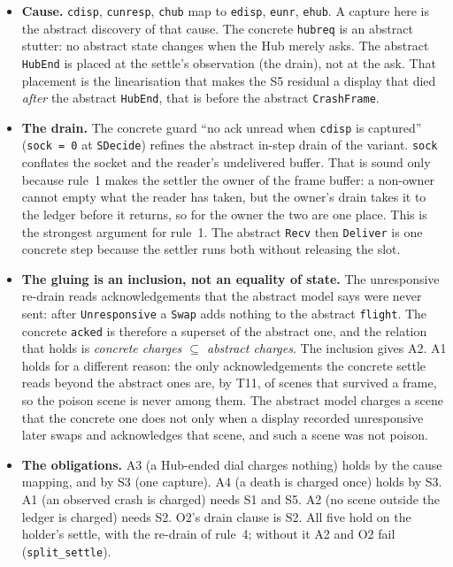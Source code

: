 \documentclass[a4paper,10pt,fleqn]{article}
\begin{document}
\begin{itemize}
  \item \textbf{Cause.}  \texttt{cdisp}, \texttt{cunresp}, \texttt{chub} map to
    \texttt{edisp}, \texttt{eunr}, \texttt{ehub}.  A capture here is the abstract
    discovery of that cause.  The concrete \texttt{hubreq} is an abstract
    stutter: no abstract state changes when the Hub merely asks.  The abstract
    \texttt{HubEnd} is placed at the settle's observation (the drain), not at the
    ask.  That placement is the linearisation that makes the S5 residual a
    display that died \emph{after} the abstract \texttt{HubEnd}, that is before
    the abstract \texttt{CrashFrame}.
  \item \textbf{The drain.}  The concrete guard ``no ack unread when
    \texttt{cdisp} is captured'' (\texttt{sock = 0} at \texttt{SDecide}) refines
    the abstract in-step drain of the variant.  \texttt{sock} conflates the socket
    and the reader's undelivered buffer.  That is sound only because rule~1 makes
    the settler the owner of the frame buffer: a non-owner cannot empty what the
    reader has taken, but the owner's drain takes it to the ledger before it
    returns, so for the owner the two are one place.  This is the strongest
    argument for rule~1.  The abstract \texttt{Recv} then \texttt{Deliver} is one
    concrete step because the settler runs both without releasing the slot.
  \item \textbf{The gluing is an inclusion, not an equality of state.}  The
    unresponsive re-drain reads acknowledgements that the abstract model says
    were never sent: after \texttt{Unresponsive} a \texttt{Swap} adds nothing to
    the abstract \texttt{flight}.  The concrete \texttt{acked} is therefore a
    superset of the abstract one, and the relation that holds is
    \emph{concrete charges $\subseteq$ abstract charges}.  The inclusion gives A2.
    A1 holds for a different reason: the only acknowledgements the concrete
    settle reads beyond the abstract ones are, by T11, of scenes that survived a
    frame, so the poison scene is never among them.  The abstract model charges
    a scene that the concrete one does not only when a display recorded
    unresponsive later swaps and acknowledges that scene, and such a scene was
    not poison.
  \item \textbf{The obligations.}  A3 (a Hub-ended dial charges nothing) holds by
    the cause mapping, and by S3 (one capture).  A4 (a death is charged once)
    holds by S3.  A1 (an observed crash is charged) needs S1 and S5.  A2 (no
    scene outside the ledger is charged) needs S2.  O2's drain clause is S2.  All
    five hold on the holder's settle, with the re-drain of rule~4; without it A2
    and O2 fail (\texttt{split\_settle}).
\end{itemize}
\end{document}
